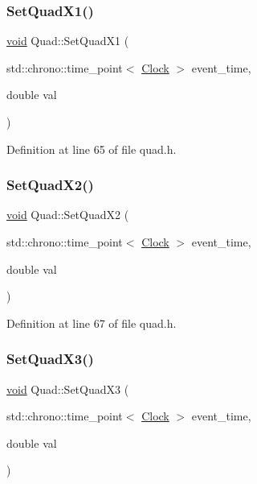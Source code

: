 \subsubsection{\texorpdfstring{Set\+Quad\+X1()}{SetQuadX1()}}
{\footnotesize\ttfamily \mbox{\hyperlink{glad_8h_a950fc91edb4504f62f1c577bf4727c29}{void}} Quad\+::\+Set\+Quad\+X1 (\begin{DoxyParamCaption}\item[{std\+::chrono\+::time\+\_\+point$<$ \mbox{\hyperlink{universe_8h_a0ef8d951d1ca5ab3cfaf7ab4c7a6fd80}{Clock}} $>$}]{event\+\_\+time,  }\item[{double}]{val }\end{DoxyParamCaption})\hspace{0.3cm}{\ttfamily [inline]}}



Definition at line 65 of file quad.\+h.

\mbox{\label{class_quad_af1df44b73207c3e70b794e889e5225af}} 
\subsubsection{\texorpdfstring{Set\+Quad\+X2()}{SetQuadX2()}}
{\footnotesize\ttfamily \mbox{\hyperlink{glad_8h_a950fc91edb4504f62f1c577bf4727c29}{void}} Quad\+::\+Set\+Quad\+X2 (\begin{DoxyParamCaption}\item[{std\+::chrono\+::time\+\_\+point$<$ \mbox{\hyperlink{universe_8h_a0ef8d951d1ca5ab3cfaf7ab4c7a6fd80}{Clock}} $>$}]{event\+\_\+time,  }\item[{double}]{val }\end{DoxyParamCaption})\hspace{0.3cm}{\ttfamily [inline]}}



Definition at line 67 of file quad.\+h.

\mbox{\label{class_quad_a0cbdd18a95fe7240b09c40fcee29f5df}} 
\subsubsection{\texorpdfstring{Set\+Quad\+X3()}{SetQuadX3()}}
{\footnotesize\ttfamily \mbox{\hyperlink{glad_8h_a950fc91edb4504f62f1c577bf4727c29}{void}} Quad\+::\+Set\+Quad\+X3 (\begin{DoxyParamCaption}\item[{std\+::chrono\+::time\+\_\+point$<$ \mbox{\hyperlink{universe_8h_a0ef8d951d1ca5ab3cfaf7ab4c7a6fd80}{Clock}} $>$}]{event\+\_\+time,  }\item[{double}]{val }\end{DoxyParamCaption})\hspace{0.3cm}{\ttfamily [inline]}}



